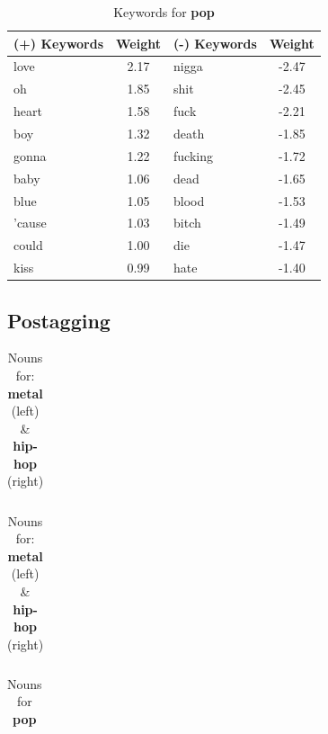 \documentclass[a4paper,11pt]{article}
\begin{document}
\begin{table}[h!]
\centering
\label{baseline}
\begin{tabular}{|lc|lc|}
\hline
(+) Keywords & Weight & (-) Keywords & Weight \\
\hline
love & 2.17 & nigga & -2.47 \\
oh & 1.85 & shit & -2.45 \\
heart & 1.58 & fuck & -2.21 \\
boy & 1.32 & death & -1.85 \\
gonna & 1.22 & fucking & -1.72 \\
baby & 1.06 & dead & -1.65 \\
blue & 1.05 & blood & -1.53 \\
'cause & 1.03 & bitch & -1.49 \\
could & 1.00 & die & -1.47 \\
kiss & 0.99 & hate & -1.40 \\
\hline
\end{tabular}
\caption{Keywords for \textbf{pop}}
\end{table}



\subsection{Postagging}

\begin{table}[h!]
\begin{tabular}{|lc|}
\hline

\hline
\end{tabular}
\quad
\begin{tabular}{|lc|lc|}
\hline

\hline
\end{tabular}
\caption{Nouns for: \textbf{metal} (left) \& \textbf{hip-hop} (right)}
\end{table}

\begin{table}[h!]
\centering
\label{baseline}
\begin{tabular}{|lc|}
\hline

\hline
\end{tabular}
\caption{Nouns for \textbf{pop}}
\end{table}
\end{document}
